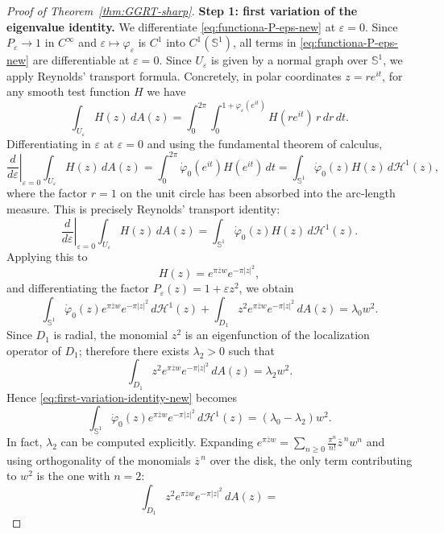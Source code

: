 \documentclass[a4paper,11pt,reqno]{amsart}
\numberwithin{equation}{section}
\theoremstyle{plain} %
\theoremstyle{definition} %
\theoremstyle{remark}
\begin{document}
\begin{proof}[Proof of Theorem~\ref{thm:GGRT-sharp}]
\medskip
\noindent
{\bf Step 1: first variation of the eigenvalue identity.} We differentiate \eqref{eq:functiona-P-eps-new} at $\varepsilon=0$.
Since \(P_\varepsilon\to 1\) in \(C^\infty\) and
\(\varepsilon\mapsto \varphi_\varepsilon\) is \(C^1\) into \(C^1(\mathbb S^1)\),
all terms in \eqref{eq:functiona-P-eps-new} are differentiable at
\(\varepsilon=0\). Since $U_\varepsilon$ is given by a normal graph over
$\mathbb S^1$, we apply Reynolds' transport formula. Concretely, in polar
coordinates \(z=re^{it}\), for any smooth test function \(H\) we have
\[
\int_{U_\varepsilon} H(z)\,dA(z)
=
\int_0^{2\pi}\int_0^{1+\varphi_\varepsilon(e^{it})}
H(re^{it})\,r\,dr\,dt.
\]
Differentiating in \(\varepsilon\) at \(\varepsilon=0\) and using the
fundamental theorem of calculus,
\[
\left.\frac{d}{d\varepsilon}\right|_{\varepsilon=0}
\int_{U_\varepsilon} H(z)\,dA(z)
=
\int_0^{2\pi}\dot\varphi_0(e^{it})H(e^{it})\,dt
=
\int_{\mathbb S^1}\dot\varphi_0(z)H(z)\,d\mathcal H^1(z),
\]
where the factor \(r=1\) on the unit circle has been absorbed into the
arc-length measure. This is precisely Reynolds' transport identity:
\[
\left.\frac{d}{d\varepsilon}\right|_{\varepsilon=0}
\int_{U_\varepsilon} H(z)\,dA(z)
=
\int_{\mathbb S^1} \dot\varphi_0(z)H(z)\,d\mathcal H^1(z).
\]
Applying this to
\[
H(z)=e^{\pi \overline zw}e^{-\pi|z|^2},
\]
and differentiating the factor $P_\varepsilon(z)=1+\varepsilon z^2$, we obtain
\begin{equation}\label{eq:first-variation-identity-new}
\int_{\mathbb S^1}
\dot\varphi_0(z)e^{\pi \overline zw}e^{-\pi|z|^2}\,d\mathcal H^1(z)
+
\int_{D_1} z^2 e^{\pi \overline zw}e^{-\pi|z|^2}\,dA(z)
=
\lambda_0 w^2.
\end{equation}
Since $D_1$ is radial, the monomial $z^2$ is an eigenfunction of the
localization operator of $D_1$; therefore there exists $\lambda_2>0$ such that
\[
\int_{D_1} z^2 e^{\pi \overline zw}e^{-\pi|z|^2}\,dA(z)=\lambda_2 w^2.
\]
Hence \eqref{eq:first-variation-identity-new} becomes
\begin{equation}\label{eq:boundary-identity-new}
\int_{\mathbb S^1}
\dot\varphi_0(z)e^{\pi \overline zw}e^{-\pi|z|^2}\,d\mathcal H^1(z)
=
(\lambda_0-\lambda_2)w^2.
\end{equation}
In fact, \(\lambda_2\) can be computed explicitly. Expanding
\(e^{\pi \overline zw}=\sum_{n\geq 0}\frac{\pi^n}{n!}\overline z^{\,n}w^n\)
and using orthogonality of the monomials \(\overline z^{\,n}\) over the disk,
the only term contributing to \(w^2\) is the one with \(n=2\):
\[
\int_{D_1} z^2 e^{\pi \overline zw}e^{-\pi|z|^2}\,dA(z)
=
\]
\end{proof}
\end{document}
